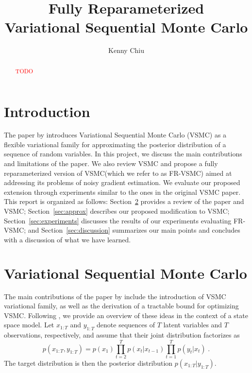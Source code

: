 \documentclass[12pt]{article}
\title{\vspace{-1.5cm}\textbf{Fully Reparameterized \\ Variational Sequential Monte Carlo}}
\author{Kenny Chiu}
\date{}
\newcommand{\todo}{\textcolor{red}{TODO}}
\newcommand{\vsmc}{\textsc{VSMC}\xspace}
\newcommand{\frvsmc}{\textsc{FR-VSMC}\xspace}
\begin{document}
\maketitle
\thispagestyle{fancy}

\begin{abstract}
\todo
\end{abstract}

\section{Introduction}

The paper by \textcite{Naesseth:2018} introduces Variational Sequential Monte Carlo (\vsmc) as a flexible variational family for approximating the posterior distribution of a sequence of random variables. In this project, we discuss the main contributions and limitations of the paper. We also review \vsmc and propose a fully reparameterized version of \vsmc (which we refer to as \frvsmc) aimed at addressing its problems of noisy gradient estimation. We evaluate our proposed extension through experiments similar to the ones in the original \vsmc paper.
\\

This report is organized as follows: Section~\ref{sec:vsmc} provides a review of the paper and \vsmc; Section~\ref{sec:approx} describes our proposed modification to \vsmc; Section~\ref{sec:experiments} discusses the results of our experiments evaluating \frvsmc; and Section~\ref{sec:discussion} summarizes our main points and concludes with a discussion of what we have learned.


\section{Variational Sequential Monte Carlo}\label{sec:vsmc}

The main contributions of the paper by \textcite{Naesseth:2018} include the introduction of \vsmc variational family, as well as the derivation of a tractable bound for optimizing \vsmc. Following \parencite{Naesseth:2018}, we provide an overview of these ideas in the context of a state space model. Let $x_{1:T}$ and $y_{1:T}$ denote sequences of $T$ latent variables and $T$ observations, respectively, and assume that their joint distribution factorizes as
\[
p(x_{1:T},y_{1:T}) = p(x_1)\prod_{t=2}^Tp(x_t|x_{t-1})\prod_{t=1}^Tp(y_t|x_t) \;.
\]
The target distribution is then the posterior distribution $p(x_{1:T}|y_{1:T})$.
\end{document}
